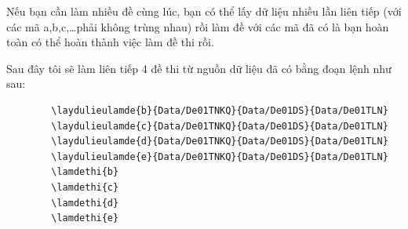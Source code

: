 	Nếu bạn cần làm nhiều đề cùng lúc, bạn có thể lấy dữ liệu nhiều lần liên tiếp (với các mã a,b,c,\ldots phải không trùng nhau) rồi làm đề với các mã đã có là bạn hoàn toàn có thể hoàn thành việc làm đề thi rồi.
	
	Sau đây tôi sẽ làm liên tiếp 4 đề thi từ nguồn dữ liệu đã có bằng đoạn lệnh như sau:
	\begin{verbatim}
		\laydulieulamde{b}{Data/De01TNKQ}{Data/De01DS}{Data/De01TLN}
		\laydulieulamde{c}{Data/De01TNKQ}{Data/De01DS}{Data/De01TLN}
		\laydulieulamde{d}{Data/De01TNKQ}{Data/De01DS}{Data/De01TLN}
		\laydulieulamde{e}{Data/De01TNKQ}{Data/De01DS}{Data/De01TLN}
		\lamdethi{b}
		\lamdethi{c}
		\lamdethi{d}
		\lamdethi{e}
	\end{verbatim}
	
	
